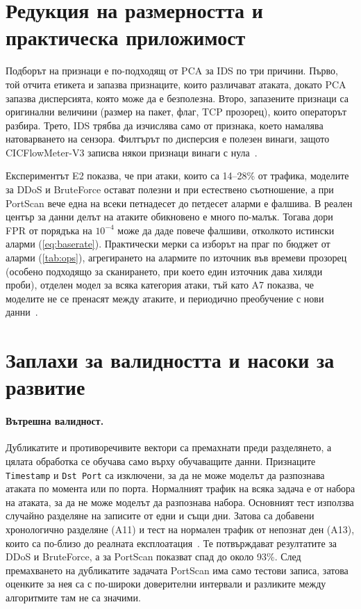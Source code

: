 \section{Редукция на размерността и практическа приложимост}
Подборът на признаци е по-подходящ от PCA за IDS по три причини. Първо, той отчита етикета и запазва признаците, които различават атаката, докато PCA запазва дисперсията, която може да е безполезна. Второ, запазените признаци са оригинални величини (размер на пакет, флаг, TCP прозорец), които операторът разбира. Трето, IDS трябва да изчислява само  от  признака, което намалява натоварването на сензора. Филтърът по дисперсия е полезен винаги, защото CICFlowMeter-V3 записва някои признаци винаги с нула~\cite{guyon2003}.

Експериментът E2 показва, че при атаки, които са 14--28\% от трафика, моделите за DDoS и BruteForce остават полезни и при естествено съотношение, а при PortScan вече една на всеки петнадесет до петдесет аларми е фалшива. В реален център за данни делът на атаките обикновено е много по-малък. Тогава дори FPR от порядъка на $10^{-4}$ може да даде повече фалшиви, отколкото истински аларми (\cref{eq:baserate}). Практически мерки са изборът на праг по бюджет от аларми (\cref{tab:ops}), агрегирането на алармите по източник във времеви прозорец (особено подходящо за сканирането, при което един източник дава хиляди проби), отделен модел за всяка категория атаки, тъй като A7 показва, че моделите не се пренасят между атаките, и периодично преобучение с нови данни~\cite{axelsson2000,sommer2010}.

\section{Заплахи за валидността и насоки за развитие}
\paragraph{Вътрешна валидност.} Дубликатите и противоречивите вектори са премахнати преди разделянето, а цялата обработка се обучава само върху обучаващите данни. Признаците \texttt{Timestamp} и \texttt{Dst Port} са изключени, за да не може моделът да разпознава атаката по момента или по порта. Нормалният трафик на всяка задача е от набора на атаката, за да не може моделът да разпознава набора. Основният тест използва случайно разделяне на записите от едни и същи дни. Затова са добавени хронологично разделяне (A11) и тест на нормален трафик от непознат ден (A13), които са по-близо до реалната експлоатация~\cite{arp2022}. Те потвърждават резултатите за DDoS и BruteForce, а за PortScan показват спад до около 93\%. След премахването на дубликатите задачата PortScan има само  тестови записа, затова оценките за нея са с по-широки доверителни интервали и разликите между алгоритмите там не са значими.

